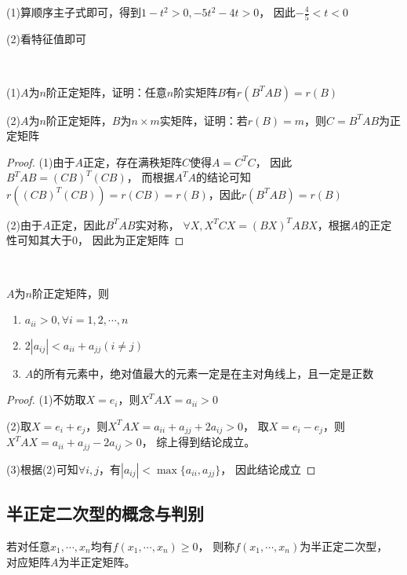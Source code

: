 \begin{solution}
  (1)算顺序主子式即可，得到$1 - t^2 > 0, -5t^2 - 4t > 0$，
  因此$- \frac{4}{5} < t < 0$

  (2)看特征值即可
\end{solution}

~

\begin{exercise}[正定矩阵性质的简单应用]
  (1)$A$为$n$阶正定矩阵，证明：任意$n$阶实矩阵$B$有$r(B^TAB) = r(B)$

  (2)$A$为$n$阶正定矩阵，$B$为$n \times m$实矩阵，证明：若$r(B) = m$，则$C = B^TAB$为正定矩阵
\end{exercise}

\begin{proof}
  (1)由于$A$正定，存在满秩矩阵$C$使得$A = C^TC$，
  因此$B^TAB = (CB)^T(CB)$，
  而根据$A^TA$的结论可知$r((CB)^T(CB)) = r(CB) = r(B)$，因此$r(B^{T}AB) = r(B)$

  (2)由于$A$正定，因此$B^TAB$实对称，
  $\forall X, X^TCX = (BX)^TABX$，根据$A$的正定性可知其大于$0$，
  因此为正定矩阵
\end{proof}

~


\begin{theorem}[正定矩阵对角性质]
  $A$为$n$阶正定矩阵，则
  \begin{enumerate}
  \item $a_{ii} > 0, \forall i = 1,2,\cdots,n$
  \item $2|a_{ij}| < a_{ii} + a_{jj}(i \neq j)$
  \item $A$的所有元素中，绝对值最大的元素一定是在主对角线上，且一定是正数
  \end{enumerate}
\end{theorem}

\begin{proof}
  (1)不妨取$X = e_i$，则$X^TAX = a_{ii} > 0$

  (2)取$X = e_i + e_j$，则$X^TAX = a_{ii} + a_{jj} + 2a_{ij} > 0$，
  取$X = e_i - e_j$，则$X^TAX = a_{ii} + a_{jj} - 2a_{ij} > 0$，
  综上得到结论成立。

  (3)根据(2)可知$\forall i,j$，有$|a_{ij}| < \max \{a_{ii},a_{jj}\}$，
  因此结论成立
\end{proof}


\subsection{半正定二次型的概念与判别}

\begin{definition}[半正定二次型]
  若对任意$x_1,\cdots,x_n$均有$f(x_1,\cdots,x_n) \geq 0$，
  则称$f(x_1,\cdots,x_n)$为半正定二次型，
  对应矩阵$A$为半正定矩阵。
\end{definition}

